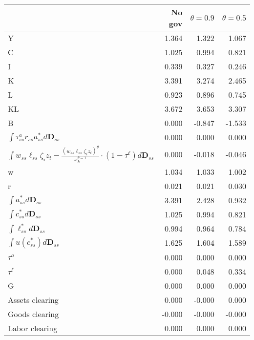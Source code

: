 \begin{tabular}{lrrr}
\toprule
 & No gov & $\theta=0.9$ & $\theta=0.5$ \\
\midrule
Y & 1.364 & 1.322 & 1.067 \\
C & 1.025 & 0.994 & 0.821 \\
I & 0.339 & 0.327 & 0.246 \\
K & 3.391 & 3.274 & 2.465 \\
L & 0.923 & 0.896 & 0.745 \\
KL & 3.672 & 3.653 & 3.307 \\
B & 0.000 & -0.847 & -1.533 \\
$\int \tau^{a}_{ss}r_{ss}a^{*}_{ss}d\mathbf{D}_{ss}$ & 0.000 & 0.000 & 0.000 \\
$\int w_{ss}\ell_{ss} \zeta_{i}z_{t} - \frac{\left(w_{ss}\ell_{ss} \zeta_{i}z_{t}\right)^{\theta}}{ x_{h}^{\theta-1}} \cdot \left(1-\tau^{\ell} \right) d\boldsymbol{D}_{ss}$ & 0.000 & -0.018 & -0.046 \\
w & 1.034 & 1.033 & 1.002 \\
r & 0.021 & 0.021 & 0.030 \\
$\int a^{*}_{ss} d\mathbf{D}_{ss}$ & 3.391 & 2.428 & 0.932 \\
$\int c^{*}_{ss} d\mathbf{D}_{ss}$ & 1.025 & 0.994 & 0.821 \\
$\int \ell^{*}_{ss} d\mathbf{D}_{ss}$ & 0.994 & 0.964 & 0.784 \\
$\int u \left(c^{*}_{ss} \right) d\mathbf{D}_{ss}$ & -1.625 & -1.604 & -1.589 \\
$\tau^{a}$ & 0.000 & 0.000 & 0.000 \\
$\tau^{\ell}$ & 0.000 & 0.048 & 0.334 \\
G & 0.000 & 0.000 & 0.000 \\
Assets clearing & 0.000 & -0.000 & 0.000 \\
Goods clearing & -0.000 & -0.000 & -0.000 \\
Labor clearing & 0.000 & 0.000 & 0.000 \\
\bottomrule
\end{tabular}
